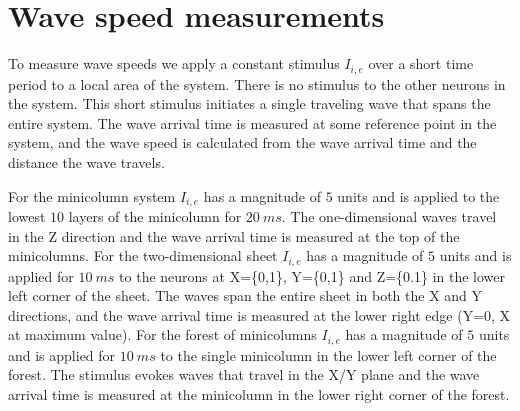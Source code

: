 \section{Wave speed measurements}\label{sec:wave_speed_method}
To measure wave speeds we apply a constant stimulus $I_{i,e}$ over a short time period to a local area of the system.
There is no stimulus to the other neurons in the system.
This short stimulus initiates a single traveling wave that spans the entire system.
The wave arrival time is measured at some reference point in the system, and the wave speed is calculated from the wave arrival time and the distance the wave travels.

For the minicolumn system $I_{i,e}$ has a magnitude of $5$ units and is applied to the lowest $10$ layers of the minicolumn for $20~ms$.
The one-dimensional waves travel in the Z direction and the wave arrival time is measured at the top of the minicolumns.
For the two-dimensional sheet $I_{i,e}$ has a magnitude of $5$ units and is applied for $10~ms$ to the neurons at X=\{0,1\}, Y=\{0,1\} and Z=\{0.1\} in the lower left corner of the sheet.
The waves span the entire sheet in both the X and Y directions, and the wave arrival time is measured at the lower right edge (Y=0, X at maximum value). 
For the forest of minicolumns $I_{i,e}$ has a magnitude of $5$ units and is applied for $10~ms$ to the single minicolumn in the lower left corner of the forest.
The stimulus evokes waves that travel in the X/Y plane and the wave arrival time is measured at the minicolumn in the lower right corner of the forest.

\endinput
